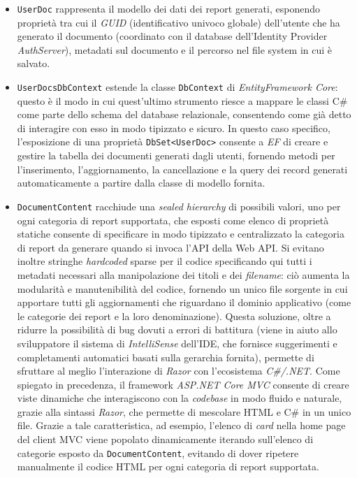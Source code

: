 \begin{itemize}
        \item \texttt{UserDoc} rappresenta il modello dei dati dei report generati, esponendo proprietà tra cui il \emph{GUID} (identificativo univoco globale) dell'utente che ha generato il documento (coordinato con il database dell'Identity Provider \emph{AuthServer}), metadati sul documento e il percorso nel file system in cui è salvato.
        \item \texttt{UserDocsDbContext} estende la classe \texttt{DbContext} di \emph{EntityFramework Core}: questo è il modo in cui quest'ultimo strumento riesce a mappare le classi C\# come parte dello schema del database relazionale, consentendo come già detto di interagire con esso in modo tipizzato e sicuro.
        In questo caso specifico, l'esposizione di una proprietà \texttt{DbSet<UserDoc>} consente a \emph{EF} di creare e gestire la tabella dei documenti generati dagli utenti, fornendo metodi per l'inserimento, l'aggiornamento, la cancellazione e la query dei record generati automaticamente a partire dalla classe di modello fornita.
        \item \texttt{DocumentContent} racchiude una \emph{sealed hierarchy} di possibili valori, uno per ogni categoria di report supportata, che esposti come elenco di proprietà statiche consente di specificare in modo tipizzato e centralizzato la categoria di report da generare quando si invoca l'API della Web API. Si evitano inoltre stringhe \emph{hardcoded} sparse per il codice specificando qui tutti i metadati necessari alla manipolazione dei titoli e dei \emph{filename}: ciò aumenta la modularità e manutenibilità del codice, fornendo un unico file sorgente in cui apportare tutti gli aggiornamenti che riguardano il dominio applicativo (come le categorie dei report e la loro denominazione).
        Questa soluzione, oltre a ridurre la possibilità di bug dovuti a errori di battitura (viene in aiuto allo sviluppatore il sistema di \emph{IntelliSense} dell'IDE, che fornisce suggerimenti e completamenti automatici basati sulla gerarchia fornita), permette di sfruttare al meglio l'interazione di \emph{Razor} con l'ecosistema \emph{C\#/.NET}.
        Come spiegato in precedenza, il framework \emph{ASP.NET Core MVC} consente di creare viste dinamiche che interagiscono con la \emph{codebase} in modo fluido e naturale, grazie alla sintassi \emph{Razor}, che permette di mescolare HTML e C\# in un unico file.
        Grazie a tale caratteristica, ad esempio, l'elenco di \emph{card} nella home page del client MVC viene popolato dinamicamente iterando sull'elenco di categorie esposto da \texttt{DocumentContent}, evitando di dover ripetere manualmente il codice HTML per ogni categoria di report supportata.
\vspace{0.5cm}


\end{itemize}
